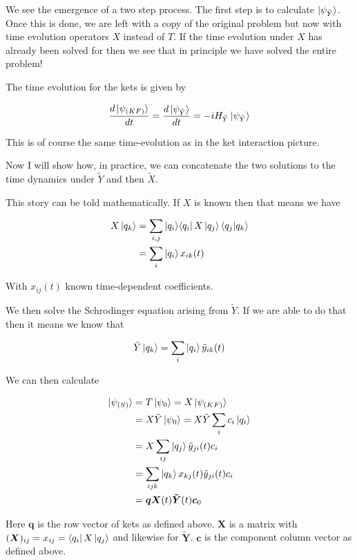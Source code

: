 \documentclass[12pt]{article}
\newcommand{\ddt}[1]{\frac{d #1}{dt}}
\newcommand{\bv}[1]{\boldsymbol{#1}}
\newcommand{\ketbra}[2]{\Ket{#1}\!\Bra{#2}}
\begin{document}
We see the emergence of a two step process. The first step is to calculate $\ket{\psi_{\tilde{Y}}}$. Once this is done, we are left with a copy of the original problem but now with time evolution operators $X$ instead of $T$. If the time evolution under $X$ has already been solved for then we see that in principle we have solved the entire problem!

The time evolution for the kets is given by

\begin{align}
\ddt{\ket{\psi_{(KF)}}} = \ddt{\ket{\psi_{\tilde{Y}}}} = -iH_{\tilde{Y}} \ket{\psi_{\tilde{Y}}}
\end{align}

This is of course the same time-evolution as in the ket interaction picture.

Now I will show how, in practice, we can concatenate the two solutions to the time dynamics under $\tilde{Y}$ and then $\tilde{X}$.


This story can be told mathematically. If $X$ is known then that means we have

\begin{align}
X\ket{q_k} &= \sum_{i,j} \ketbra{q_i}{q_i} X \ket{q_j}\braket{q_j|q_k}\\
&= \sum_{i} \ket{q_i} x_{ik}(t)
\end{align}

With $x_{ij}(t)$ known time-dependent coefficients. 

We then solve the Schrodinger equation arising from $\tilde{Y}$. If we are able to do that then it means we know that

\begin{align}
\tilde{Y}\ket{q_k} = \sum_i \ket{q_i}\tilde{y}_{ik}(t)
\end{align}

We can then calculate

\begin{align}
\ket{\psi_{(S)}} &= T\ket{\psi_0} = X\ket{\psi_{(KF)}}\\
&= X\tilde{Y}\ket{\psi_0} = X\tilde{Y}\sum_i c_i \ket{q_i}\\
&= X\sum_{ij}\ket{q_j} \tilde{y}_{ji}(t) c_i\\
&= \sum_{ijk} \ket{q_k} x_{kj}(t)\tilde{y}_{ji}(t)c_i \\
&= \bv{q}\bv{X}(t)\bv{\tilde{Y}}(t)\bv{c}_0
\end{align}

Here $\bv{q}$ is the row vector of kets as defined above. $\bv{X}$ is a matrix with $(\bv{X})_{ij} = x_{ij} = \bra{q_i}X\ket{q_j}$ and likewise for $\bv{\tilde{Y}}$. $\bv{c}$ is the component column vector as defined above.
\end{document}
